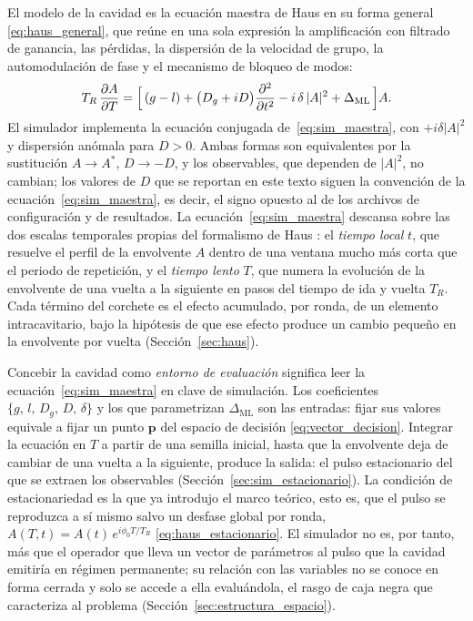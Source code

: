 El modelo de la cavidad es la ecuación maestra de Haus en su forma general
\eqref{eq:haus_general}, que reúne en una sola expresión la amplificación con
filtrado de ganancia, las pérdidas, la dispersión de la velocidad de grupo, la
automodulación de fase y el mecanismo de bloqueo de modos:
%
\begin{equation}
    T_R\,\frac{\partial A}{\partial T}
    = \Bigl[\,(g-l)
      + \bigl(D_g + iD\bigr)\frac{\partial^2}{\partial t^2}
            - i\,\delta\,|A|^2
      + \Delta_{\mathrm{ML}} \,\Bigr] A .
    \label{eq:sim_maestra}
\end{equation}
%
El simulador implementa la ecuación conjugada de~\eqref{eq:sim_maestra}, con
$+i\delta|A|^2$ y dispersión anómala para $D>0$. Ambas formas son equivalentes por la
sustitución $A\to A^{*}$, $D\to-D$, y los observables, que dependen de $|A|^2$, no
cambian; los valores de $D$ que se reportan en este texto siguen la convención de la
ecuación~\eqref{eq:sim_maestra}, es decir, el signo opuesto al de los archivos de
configuración y de resultados.
La ecuación~\eqref{eq:sim_maestra} descansa sobre las dos escalas temporales
propias del formalismo de Haus \cite{Haus2000,Kaertner2020}: el \emph{tiempo local}
$t$, que resuelve el perfil de la envolvente $A$ dentro de una ventana mucho más
corta que el periodo de repetición, y el \emph{tiempo lento} $T$, que numera la
evolución de la envolvente de una vuelta a la siguiente en pasos del tiempo de ida y
vuelta $T_R$. Cada término del corchete es el efecto acumulado, por ronda, de un
elemento intracavitario, bajo la hipótesis de que ese efecto produce un cambio
pequeño en la envolvente por vuelta (Sección~\ref{sec:haus}).

Concebir la cavidad como \emph{entorno de evaluación} significa leer la
ecuación~\eqref{eq:sim_maestra} en clave de simulación. Los coeficientes
$\{g,\,l,\,D_g,\,D,\,\delta\}$ y los que parametrizan $\Delta_{\mathrm{ML}}$ son las
entradas: fijar sus valores equivale a fijar un punto $\mathbf{p}$ del espacio de
decisión \eqref{eq:vector_decision}. Integrar la ecuación en $T$ a partir de una
semilla inicial, hasta que la envolvente deja de cambiar de una vuelta a la
siguiente, produce la salida: el pulso estacionario del que se extraen los
observables (Sección~\ref{sec:sim_estacionario}). La condición de estacionariedad es
la que ya introdujo el marco teórico, esto es, que el pulso se reproduzca a sí mismo
salvo un desfase global por ronda, $A(T,t)=A(t)\,e^{i\phi_0 T/T_R}$
\eqref{eq:haus_estacionario}. El simulador no es, por tanto, más que el operador que
lleva un vector de parámetros al pulso que la cavidad emitiría en régimen
permanente; su relación con las variables no se conoce en forma cerrada y solo se
accede a ella evaluándola, el rasgo de caja negra que caracteriza al problema
(Sección~\ref{sec:estructura_espacio}).

